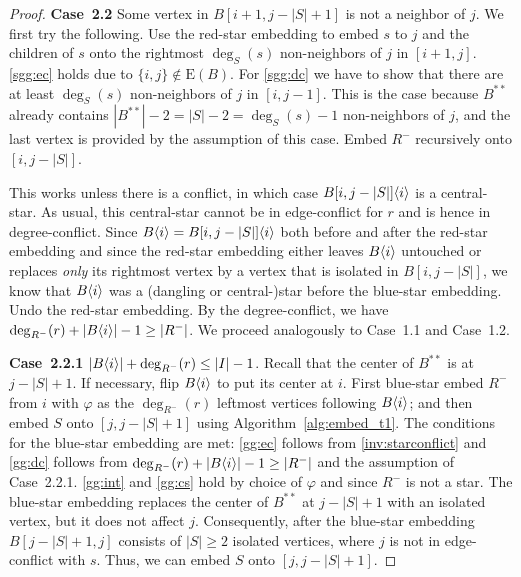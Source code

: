 \documentclass[11pt,a4paper,colorlinks=true,urlcolor=blue,citecolor=red]{article}
\theoremstyle{plain}
\newcommand{\case}[1]{\par\vspace{.5\baselineskip}\noindent\textbf{\sffamily Case~#1}}
\newcommand{\EB}{\mathrm{E}(B)}
\begin{document}
\begin{proof}
  \case{2.2} Some vertex in $B[i+1,j-|S|+1]$ is not a neighbor of $j$.
  We first try the following. Use the red-star embedding to embed $s$ to
  $j$ and the children of $s$ onto the rightmost $\deg_S(s)$
  non-neighbors of $j$ in $[i+1,j]$. \ref{sgg:ec} holds due to
  $\{i,j\}\not\in\EB$. For \ref{sgg:dc} we have to show that there are
  at least $\deg_S(s)$ non-neighbors of $j$ in $[i,j-1]$. This is the
  case because $B^{**}$ already contains $|B^{**}|-2=|S|-2=\deg_S(s)-1$
  non-neighbors of $j$, and the last vertex is provided by the
  assumption of this case. Embed $R^-$ recursively onto $[i,j-|S|]$.

  This works unless there is a conflict, in which case
  $B{[i,j-|S|]}\langle{i}\rangle$ is a central-star. As usual, this
  central-star cannot be in edge-conflict for $r$ and is hence in
  degree-conflict. Since $B\langle{i}\rangle=B{[i,j-|S|]}\langle{i}\rangle$ both before
  and after the red-star embedding and since the
  red-star embedding either leaves $B\langle{i}\rangle$ untouched or
  replaces \emph{only} its rightmost vertex by a vertex that is isolated
  in $B[i,j-|S|]$, we know that $B\langle{i}\rangle$ was a (dangling or
  central-)star before the blue-star embedding. Undo the
  red-star embedding. By the degree-conflict, we have
  $\deg_{R^-}(r)+|B\langle{i}\rangle|-1\geq|R^-|$. We proceed analogously to
  Case~1.1 and Case~1.2.

  \case{2.2.1} $|B\langle{i}\rangle|+\deg_{R^-}(r)\leq|I|-1$. Recall that the
  center of $B^{**}$ is at $j-|S|+1$. If necessary, flip $B\langle{i}\rangle$ to
  put its center at $i$. First blue-star embed $R^-$ from $i$ with
  $\varphi$ as the $\deg_{R^-}(r)$ leftmost vertices following
  $B\langle{i}\rangle$; and then embed $S$ onto $[j,j-|S|+1]$ using
  Algorithm~\ref{alg:embed_t1}. The conditions for the blue-star
  embedding are met: \ref{gg:ec} follows from \ref{inv:starconflict} and
  \ref{gg:dc} follows from $\deg_{R^-}(r)+|B\langle{i}\rangle|-1\geq|R^-|$ and
  the assumption of Case~2.2.1. \ref{gg:int} and \ref{gg:cs} hold by
  choice of $\varphi$ and since $R^-$ is not a star. The blue-star
  embedding replaces the center of $B^{**}$ at $j-|S|+1$ with an
  isolated vertex, but it does not affect $j$. Consequently, after the
  blue-star embedding $B[j-|S|+1,j]$ consists of $|S|\geq 2$ isolated
  vertices, where $j$ is not in edge-conflict with $s$. Thus, we can
  embed $S$ onto $[j,j-|S|+1]$.


\end{proof}
\end{document}
